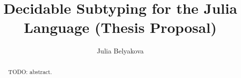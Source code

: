 \title{Decidable Subtyping for the Julia Language (Thesis Proposal)}

\author{Julia Belyakova}

\date{}

\maketitle


\begin{abstract}
  TODO: abstract.
\end{abstract}
